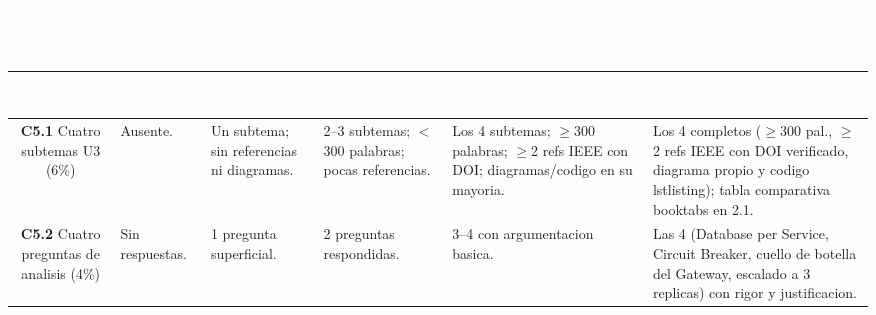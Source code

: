 \documentclass[10pt]{article}
\newcommand{\cab}[1]{\textcolor{white}{\textbf{#1}}}
\newcommand{\titulobanner}[1]{%
\begin{tcolorbox}[colback=azulOscuro,colframe=azulOscuro,boxrule=0pt,arc=2pt,left=8pt,right=8pt,top=5pt,bottom=5pt]
\textcolor{white}{\large\textbf{#1}}
\end{tcolorbox}}
\newcommand{\dimtitulo}[1]{%
\vspace{4pt}\begin{tcolorbox}[colback=azulMedio,colframe=azulMedio,boxrule=0pt,arc=1pt,left=6pt,right=6pt,top=3pt,bottom=3pt]
\textcolor{white}{\textbf{#1}}\end{tcolorbox}\vspace{-2pt}}
\begin{document}
\clearpage
\titulobanner{Matriz de evaluacion (continuacion)}
\vspace{3pt}
\dimtitulo{D5. Fundamento teorico Unidad 3 y analisis (10\%)}
\noindent\begin{tabularx}{\textwidth}{C *{5}{Y}}
\toprule
{} \cab{Criterio (peso)} & \cab{Nivel 0 -- Ausente} & \cab{Nivel 1} & \cab{Nivel 2} & \cab{Nivel 3} & \cab{Nivel 4} \\ \midrule
\textbf{C5.1} Cuatro subtemas U3 (6\%) & Ausente. & Un subtema; sin referencias ni diagramas. & 2--3 subtemas; $<$300 palabras; pocas referencias. & Los 4 subtemas; $\geq$300 palabras; $\geq$2 refs IEEE con DOI; diagramas/codigo en su mayoria. & Los 4 completos ($\geq$300 pal., $\geq$2 refs IEEE con DOI verificado, diagrama propio y codigo lstlisting); tabla comparativa booktabs en 2.1. \\
\textbf{C5.2} Cuatro preguntas de analisis (4\%) & Sin respuestas. & 1 pregunta superficial. & 2 preguntas respondidas. & 3--4 con argumentacion basica. & Las 4 (Database per Service, Circuit Breaker, cuello de botella del Gateway, escalado a 3 replicas) con rigor y justificacion. \\
\bottomrule
\end{tabularx}
\end{document}
